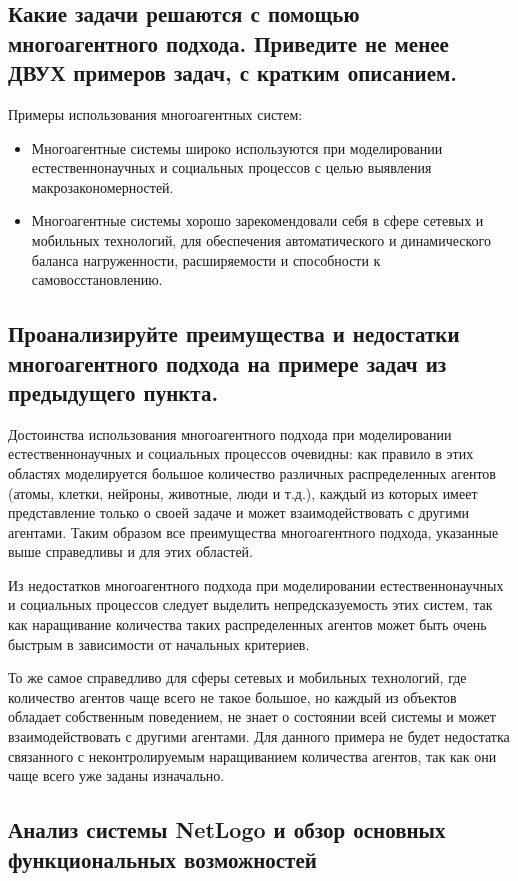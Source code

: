 \documentclass[14pt,a4paper,report]{report}
\begin{document}
\subsection{Какие задачи решаются с помощью многоагентного подхода. Приведите не менее ДВУХ примеров задач, с кратким описанием.}

Примеры использования многоагентных систем:

\begin{itemize}
	\item Многоагентные системы широко используются при моделировании естественнонаучных и социальных процессов с целью выявления макрозакономерностей.
	\item Многоагентные системы хорошо зарекомендовали себя в сфере сетевых и мобильных технологий, для обеспечения автоматического и динамического баланса нагруженности, расширяемости и способности к самовосстановлению.
\end{itemize}

\subsection{Проанализируйте преимущества и недостатки многоагентного подхода на примере задач из предыдущего пункта.}

Достоинства использования многоагентного подхода при моделировании естественнонаучных и социальных процессов очевидны: как правило в этих областях моделируется большое количество различных распределенных агентов (атомы, клетки, нейроны, животные, люди и т.д.), каждый из которых имеет представление только о своей задаче и может взаимодействовать с другими агентами. Таким образом все преимущества многоагентного подхода, указанные выше справедливы и для этих областей.

Из недостатков многоагентного подхода при моделировании естественнонаучных и социальных процессов следует выделить непредсказуемость этих систем, так как наращивание количества таких распределенных агентов может быть очень быстрым в зависимости от начальных критериев. 

То же самое справедливо для сферы сетевых и мобильных технологий, где количество агентов чаще всего не такое большое, но каждый из объектов обладает собственным поведением, не знает о состоянии всей системы и может взаимодействовать с другими агентами. Для данного примера не будет недостатка связанного с неконтролируемым наращиванием количества агентов, так как они чаще всего уже заданы изначально.

\subsection{Анализ системы NetLogo и обзор основных функциональных возможностей}
\end{document}
